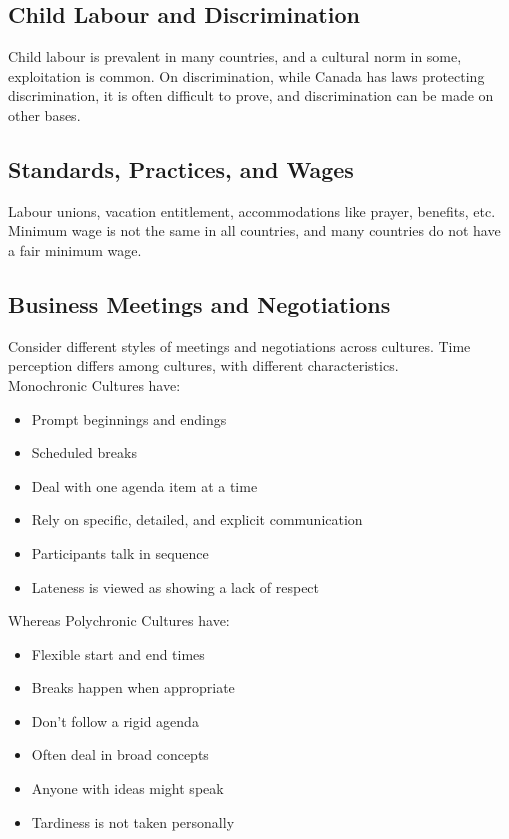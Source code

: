 \subsection{Child Labour and Discrimination}
Child labour is prevalent in many countries, and a cultural norm in some, exploitation is common.
On discrimination, while Canada has laws protecting discrimination, it is often difficult to prove, 
and discrimination can be made on other bases.

\subsection{Standards, Practices, and Wages}
Labour unions, vacation entitlement, accommodations like prayer, benefits, etc.
Minimum wage is not the same in all countries, and many countries do not have a fair minimum wage.

\subsection{Business Meetings and Negotiations}
Consider different styles of meetings and negotiations across cultures.
Time perception differs among cultures, with different characteristics. \\ 

Monochronic Cultures have:
\begin{itemize}
    \item Prompt beginnings and endings
    \item Scheduled breaks
    \item Deal with one agenda item at a time
    \item Rely on specific, detailed, and explicit communication
    \item Participants talk in sequence
    \item Lateness is viewed as showing a lack of respect
\end{itemize}

Whereas Polychronic Cultures have:
\begin{itemize}
    \item Flexible start and end times
    \item Breaks happen when appropriate
    \item Don't follow a rigid agenda 
    \item Often deal in broad concepts
    \item Anyone with ideas might speak
    \item Tardiness is not taken personally
\end{itemize}

